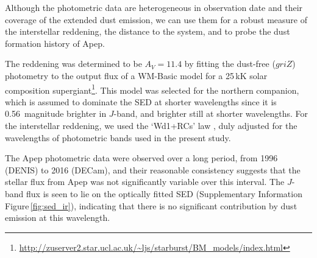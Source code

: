 \documentclass[preprint,times]{aastex61}
\begin{document}
Although the photometric data are heterogeneous in observation date and their coverage of the extended dust emission, we can use them for a robust measure of the interstellar reddening, the distance to the system, and to probe the dust formation history of Apep. 

The reddening was determined to be $A_V = 11.4$ by fitting the dust-free ($griZ$) photometry to the output flux of a WM-Basic \citep{WMBasic} model for a 25\,kK solar composition supergiant\footnote{\url{http://zuserver2.star.ucl.ac.uk/~ljs/starburst/BM_models/index.html}}. This model was selected for the northern companion, which is assumed to dominate the SED at shorter wavelengths since it is 0.56~magnitude brighter in $J$-band, and brighter still at shorter wavelengths. For the interstellar reddening, we used the `Wd1+RCs' law \citep{Damineli}, duly adjusted for the wavelengths of photometric bands used in the present study. 

The Apep photometric data were observed over a long period, from 1996 (DENIS) to 2016 (DECam), and their reasonable consistency suggests that the stellar flux from Apep was not significantly variable over this interval. The $J$-band flux is seen to lie on the optically fitted SED (Supplementary Information Figure\,\ref{fig:sed_ir}), indicating that there is no significant contribution by dust emission at this wavelength.
\end{document}
